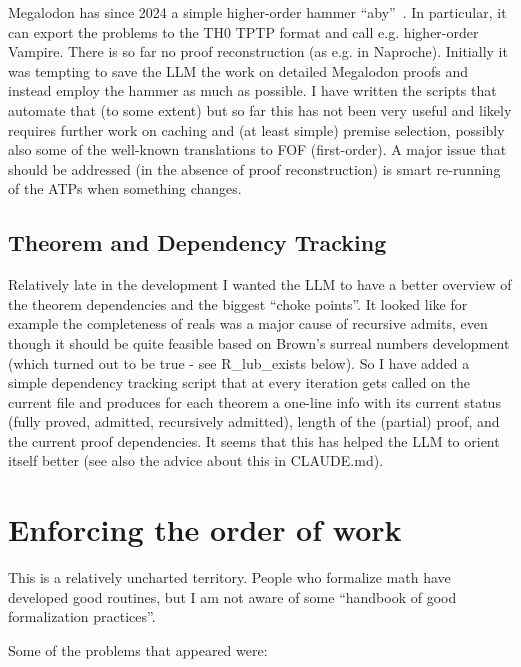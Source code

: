 \documentclass[a4paper,UKenglish,cleveref, autoref, thm-restate]{lipics-v2021}
\begin{document}
Megalodon has since 2024 a simple higher-order hammer ``aby''~\cite{DBLP:conf/mkm/BrownKSU25}. In particular, it
can export the problems to the TH0 TPTP format and call e.g. higher-order
Vampire. There is so far no proof reconstruction (as e.g. in
Naproche). Initially it was tempting to save the LLM the work on detailed
Megalodon proofs and instead employ the hammer as much as possible. I have
written the scripts that automate that (to some extent) but so far this has  not
been very useful and likely requires further work on caching and (at least simple)
premise selection, possibly also some of the well-known translations to FOF
(first-order). A major issue that should be addressed (in the absence of proof reconstruction) is smart re-running of the ATPs when something changes.

\subsection{Theorem and Dependency Tracking}

Relatively late in the development I wanted the LLM to have a better overview of
the theorem dependencies and the biggest ``choke points''. It looked like for
example the completeness of reals was a major cause of recursive admits, even
though it should be quite feasible based on Brown's surreal numbers development
(which turned out to be true - see R\_lub\_exists below). So I have added a
simple dependency tracking script that at every iteration gets called on the
current file and produces for each theorem a one-line info with its current status
(fully proved, admitted, recursively admitted), length of the (partial) proof,
and the current proof dependencies. It seems that this has helped the LLM to
orient itself better (see also the advice about this in CLAUDE.md).

\section{Enforcing the order of work}
This is a relatively uncharted territory. People who formalize math
have developed good routines, but I am not aware of some ``handbook of
good formalization practices''.

Some of the problems that appeared were:
\end{document}
